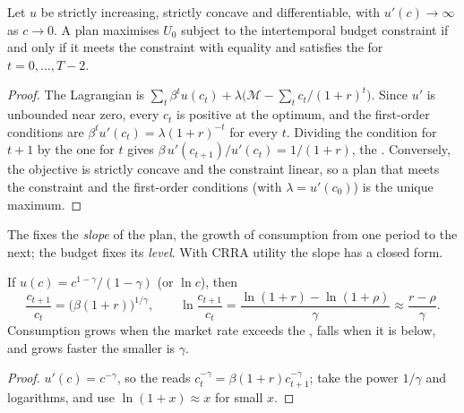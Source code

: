 \begin{proposition}\label{prop:b2:intertemporal-choice:euler}
Let $u$ be strictly increasing, strictly concave and differentiable, with $u'(c) \to \infty$ as $c \to
0$. A plan maximises $U_0$ subject to the intertemporal budget constraint if and only if it meets the
constraint with equality and satisfies the  for $t = 0, \dots, T - 2$.
\end{proposition}

\begin{proof}
The Lagrangian is $\sum_t \beta^{t} u(c_t) + \lambda\bigl(\mathcal{M} - \sum_t c_t/(1 + r)^{t}\bigr)$.
Since $u'$ is unbounded near zero, every $c_t$ is positive at the optimum, and the first-order
conditions are $\beta^{t} u'(c_t) = \lambda(1 + r)^{-t}$ for every $t$. Dividing the condition for $t +
1$ by the one for $t$ gives $\beta\,u'(c_{t+1})/u'(c_t) = 1/(1 + r)$, the . Conversely,
the objective is strictly concave and the constraint linear, so a plan that meets the constraint and
the first-order conditions (with $\lambda = u'(c_0)$) is the unique maximum.
\end{proof}

The  fixes the \emph{slope} of the plan, the growth of consumption from one period to the
next; the budget fixes its \emph{level}. With CRRA utility the slope has a closed form.

\begin{corollary}\label{cor:b2:intertemporal-choice:crra-growth}
If $u(c) = c^{1-\gamma}/(1 - \gamma)$ (or $\ln c$), then
\[
\frac{c_{t+1}}{c_t} = \bigl(\beta(1 + r)\bigr)^{1/\gamma}, \qquad \ln\frac{c_{t+1}}{c_t} =
\frac{\ln(1 + r) - \ln(1 + \rho)}{\gamma} \approx \frac{r - \rho}{\gamma}.
\]
Consumption grows when the market rate exceeds the , falls when it is below,
and grows faster the smaller is $\gamma$.
\end{corollary}

\begin{proof}
$u'(c) = c^{-\gamma}$, so the  reads $c_t^{-\gamma} = \beta(1 + r)c_{t+1}^{-\gamma}$; take
the power $1/\gamma$ and logarithms, and use $\ln(1 + x) \approx x$ for small $x$.
\end{proof}

